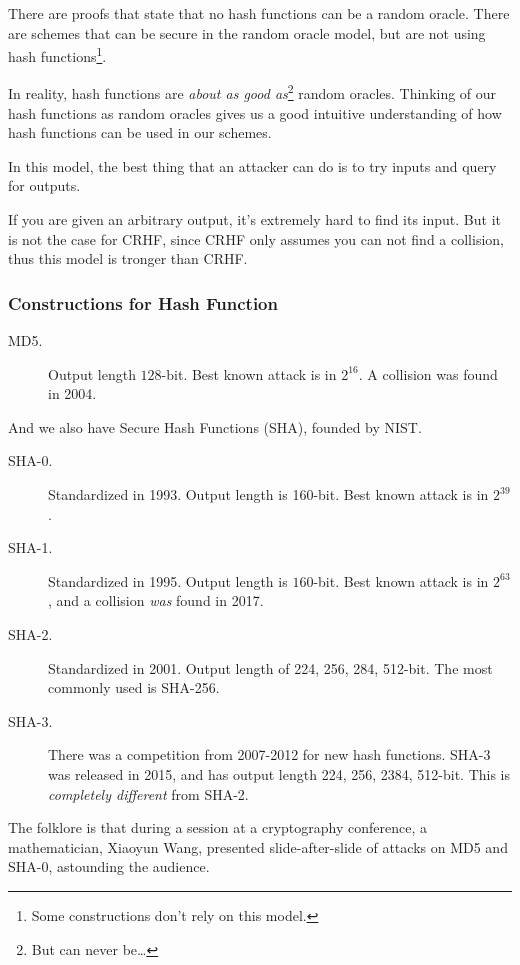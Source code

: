 
There are proofs that state that no hash functions can be a random oracle. There are schemes that can be secure in the random oracle model, but are not using hash functions\footnote{Some constructions don't rely on this model.}.

In reality, hash functions are \emph{about as good as}\footnote{But can never be\dots} random oracles. Thinking of our hash functions as random oracles gives us a good intuitive understanding of how hash functions can be used in our schemes.

In this model, the best thing that an attacker can do is to try inputs and query for outputs.

If you are given an arbitrary output, it's extremely hard to find its input. But it is not the case for CRHF, since CRHF only assumes you can not find a collision, thus this model is tronger than CRHF.


\subsubsection{Constructions for Hash Function}
\begin{description}
    \item[MD5.] Output length $128$-bit. Best known attack is in $2^{16}$. A collision was found in 2004.
\end{description}
And we also have Secure Hash Functions (SHA), founded by NIST.
\begin{description}
    \item[SHA-0.] Standardized in 1993. Output length is 160-bit. Best known attack is in $2^{39}$.
    \item[SHA-1.] Standardized in 1995. Output length is $160$-bit. Best known attack is in $2^{63}$, and a collision \emph{was} found in 2017.
    \item[SHA-2.] Standardized in 2001. Output length of 224, 256, 284, 512-bit. The most commonly used is SHA-256.
    \item[SHA-3.] There was a competition from 2007-2012 for new hash functions. SHA-3 was released in 2015, and has output length 224, 256, 2384, 512-bit. This is \emph{completely different} from SHA-2.
\end{description}

\begin{remark*}
    The folklore is that during a session at a cryptography conference, a mathematician, Xiaoyun Wang, presented slide-after-slide of attacks on MD5 and SHA-0, astounding the audience.
\end{remark*}

